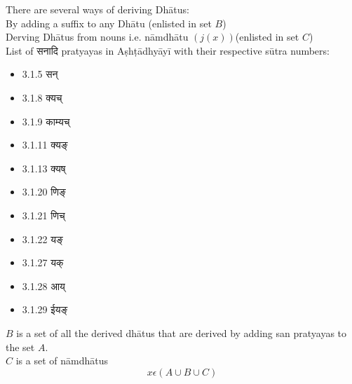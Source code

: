 There are several ways of deriving Dhātus:\\
By adding a suffix to any Dhātu (enlisted in set $B$)\\
Derving Dhātus from nouns i.e. nāmdhātu $(j(x)) $(enlisted in set $C$)\\

List of \texthindi{सनादि} pratyayas in Aṣhṭādhyāyī with their respective sūtra numbers:\\
\begin{itemize}
	\item \texthindi{3.1.5 सन्}
	\item \texthindi{3.1.8 क्यच्}
	\item \texthindi{3.1.9 काम्यच्}
	\item \texthindi{3.1.11 क्यङ्}
	\item \texthindi{3.1.13 क्यष्}
	\item \texthindi{3.1.20 णिङ्}
	\item \texthindi{3.1.21 णिच्}
	\item \texthindi{3.1.22 यङ्}
	\item \texthindi{3.1.27 यक्}
	\item \texthindi{3.1.28 आय्}
	\item \texthindi{3.1.29 ईयङ्}
\end{itemize}
$B$ is a set of all the derived dhātus that are derived by adding san pratyayas to the set $A$. \\
$C$ is a set of nāmdhātus\\
\begin{equation}
	x \epsilon (A \cup B \cup C)
\end{equation}

